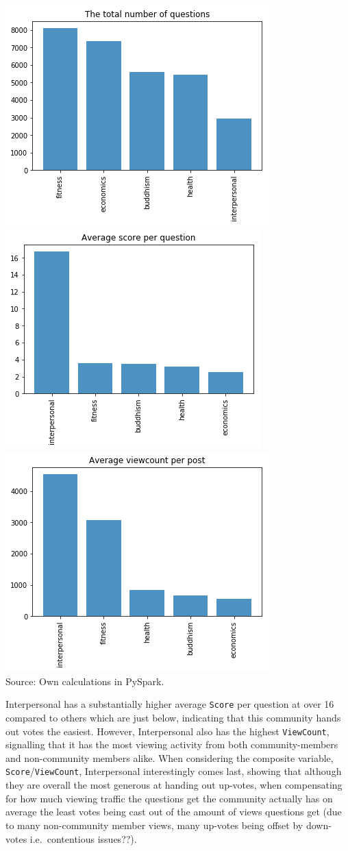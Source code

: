 \documentclass[11pt,preprint, authoryear]{article}
\let\origfigure\figure
\let\endorigfigure\endfigure
\renewenvironment{figure}[1][2] {
    \expandafter\origfigure\expandafter[H]
} {
    \endorigfigure
}
\numberwithin{equation}{section}
\begin{document}
\begin{figure}
\caption{\textbf{Fora Descriptives}}
\label{fig:desc}
\begin{minipage}{1\textwidth}

\includegraphics[width=0.32\linewidth]{../../01-python-code/00-workspace/01-graphs/post-counts-bar-graph} 
\includegraphics[width=0.32\linewidth]{../../01-python-code/00-workspace/01-graphs/ave-score-bar-graph} 
\includegraphics[width=0.32\linewidth]{../../01-python-code/00-workspace/01-graphs/ave-views-bar-graph} 
\\ \centering
{\footnotesize Source: Own calculations in PySpark.}
\end{minipage}
\end{figure}

\normalsize

Interpersonal has a substantially higher average \texttt{Score} per
question at over 16 compared to others which are just below, indicating
that this community hands out votes the easiest. However, Interpersonal
also has the highest \texttt{ViewCount}, signalling that it has the most
viewing activity from both community-members and non-community members
alike. When considering the composite variable,
\texttt{Score}/\texttt{ViewCount}, Interpersonal interestingly comes
last, showing that although they are overall the most generous at
handing out up-votes, when compensating for how much viewing traffic the
questions get the community actually has on average the least votes
being cast out of the amount of views questions get (due to many
non-community member views, many up-votes being offset by down-votes
i.e.~contentious issues??).
\end{document}
